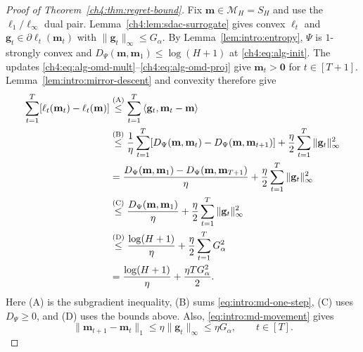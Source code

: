\begin{proof}[Proof of Theorem~\ref{ch4:thm:regret-bound}]
Fix $\mathbf m\in\mathcal M_H=S_H$ and use the $\ell_1/\ell_\infty$ dual pair.
Lemma~\ref{ch4:lem:sdac-surrogate} gives convex $\ell_t$ and
$\mathbf g_t\in\partial\ell_t(\mathbf m_t)$ with $\|\mathbf g_t\|_\infty\le G_\alpha$.
By Lemma~\ref{lem:intro:entropy}, $\Psi$ is $1$-strongly convex and
$D_\Psi(\mathbf m,\mathbf m_1)\le\log(H+1)$ at \eqref{ch4:eq:alg-init}.
The updates \eqref{ch4:eq:alg-omd-mult}--\eqref{ch4:eq:alg-omd-proj}
give $\mathbf m_t>\mathbf0$ for $t\in[T+1]$.
Lemma~\ref{lem:intro:mirror-descent} and convexity therefore give
\begin{equation}
\label{ch4:eq:scalar-surrogate-regret}
\begin{aligned}
\sum_{t=1}^T[\ell_t(\mathbf m_t)-\ell_t(\mathbf m)]
&\overset{\mathrm{(A)}}{\le}
 \sum_{t=1}^T\left\langle \mathbf g_t,\mathbf m_t-\mathbf m \right\rangle\\
&\overset{\mathrm{(B)}}{\le}
 \frac1\eta\sum_{t=1}^T
 [D_\Psi(\mathbf m,\mathbf m_t)-D_\Psi(\mathbf m,\mathbf m_{t+1})]
 +\frac\eta2\sum_{t=1}^T\|\mathbf g_t\|_\infty^2\\
&=\frac{D_\Psi(\mathbf m,\mathbf m_1)
             -D_\Psi(\mathbf m,\mathbf m_{T+1})}{\eta}
       +\frac\eta2\sum_{t=1}^T\|\mathbf g_t\|_\infty^2\\
&\overset{\mathrm{(C)}}{\le}
 \frac{D_\Psi(\mathbf m,\mathbf m_1)}{\eta}
 +\frac\eta2\sum_{t=1}^T\|\mathbf g_t\|_\infty^2\\
&\overset{\mathrm{(D)}}{\le}
 \frac{\log(H+1)}{\eta}+\frac\eta2\sum_{t=1}^TG_\alpha^2\\
&=\frac{\log(H+1)}{\eta}+\frac{\eta TG_\alpha^2}{2}.
\end{aligned}
\end{equation}
Here (A) is the subgradient inequality, (B) sums
\eqref{eq:intro:md-one-step}, (C) uses $D_\Psi\ge0$, and (D) uses
the bounds above. Also, \eqref{eq:intro:md-movement} gives
\begin{equation}
\label{ch4:eq:scalar-md-movement}
\|\mathbf m_{t+1}-\mathbf m_t\|_1
\le\eta\|\mathbf g_t\|_\infty\le\eta G_\alpha,
\qquad t\in[T].
\end{equation}


\end{proof}
